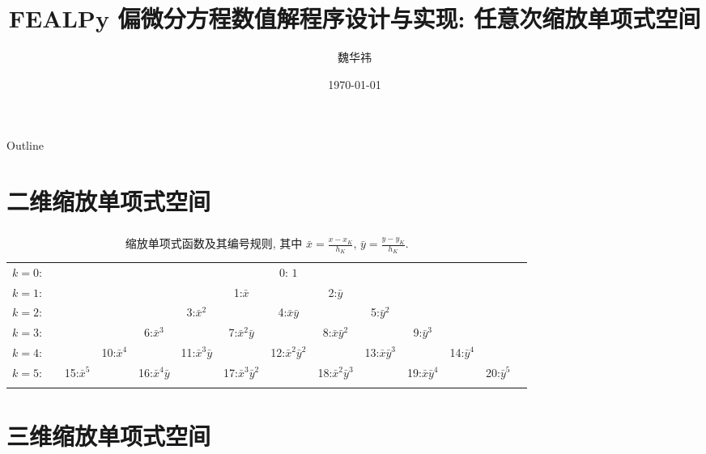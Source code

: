 \documentclass{beamer}
\title{FEALPy 偏微分方程数值解程序设计与实现: {\bf 任意次缩放单项式空间}}
\author{魏华祎}
\institute[XTU]{
weihuayi@xtu.edu.cn\\
\vspace{5pt}
湘潭大学$\bullet$数学与计算科学学院\\
}
\date[XTU]
{
    \today
}
\numberwithin{subsection}{section}
\begin{document}
\begin{frame}
  \titlepage
\end{frame}

\begin{frame}{Outline}
  \tableofcontents
\end{frame}

\section{二维缩放单项式空间}

\begin{frame}
    \frametitle{}
    \begin{table}[H]
\begin{tabular}{rccccccccccccc}
    $k=0$:&    &    &    &    &    &    & 0: $1$\\\noalign{\smallskip\smallskip}
    $k=1$:&    &    &    &    &    &  1:$\bar x$ &    &  2:$\bar y$\\\noalign{\smallskip\smallskip}
    $k=2$:&    &    &    &    &  3:${\bar x}^2$ &    &  4:$\bar x\bar y$ &    & 5:${\bar y}^2$\\\noalign{\smallskip\smallskip}
    $k=3$:&    &    &    &  6:${\bar x}^3$ &    &  7:${\bar x}^2\bar y$ &    & 8:$\bar x{\bar y}^2$ &    &  9:${\bar y}^3$\\\noalign{\smallskip\smallskip}
    $k=4$:&    &    &  10:${\bar x}^4$ &    &  11:${\bar x}^3\bar y$ &    & 12:${\bar x}^2{\bar y}^2$ &    &  13:${\bar x}{\bar y}^3$ &    & 14:${\bar y}^4$ \\\noalign{\smallskip\smallskip}
    $k=5$:&    &  15:${\bar x}^5$ &    &  16:${\bar x}^4\bar y$ &    & 17:${\bar x}^3{\bar y}^2$ &    & 18:${\bar x}^2{\bar y}^3$ &    & 19:${\bar x}{\bar y}^4$ &    &  20:${\bar y}^5$
    \\\noalign{\smallskip\smallskip}
\end{tabular}
    \caption{缩放单项式函数及其编号规则, 其中 $\bar x = \frac{x - x_K}{h_K}$,
    $\bar y = \frac{ y - y_K}{h_K}$.}\label{tb:scalep}
\end{table}
\end{frame}

\section{三维缩放单项式空间}
\end{document}
